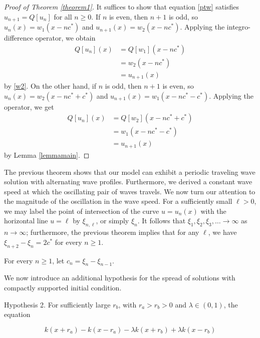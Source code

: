 \documentclass[11pt]{article}
\theoremstyle{definition}
\numberwithin{equation}{section}
\numberwithin{thm}{section}
\begin{document}
\begin{proof}[Proof of Theorem \ref{theorem1}]
It suffices to show that equation \eqref{ptw} satisfies $u_{n+1}=Q[u_n]$ for all $n \geq 0$. If $n$ is even, then $n+1$ is odd, so $u_n(x)=w_1(x-nc^*)$ and $u_{n+1}(x)=w_2(x-nc^*)$. Applying the integro-difference operator, we obtain
\begin{equation} \begin{aligned}
Q[u_n](x) &= Q[w_1](x-nc^*) \\
&= w_2(x-nc^*) \\
&= u_{n+1}(x)
\end{aligned} \end{equation}
by \eqref{w2}. On the other hand, if $n$ is odd, then $n+1$ is even, so $u_n(x)=w_2(x-nc^*+c^*)$ and $u_{n+1}(x)=w_1(x-nc^*-c^*)$. Applying the operator, we get
\begin{equation} \begin{aligned}
Q[u_n](x) &= Q[w_2](x-nc^*+c^*) \\
&= w_1(x-nc^*-c^*) \\
&= u_{n+1}(x)
\end{aligned} \end{equation}
by Lemma \ref{lemmamain}.
\end{proof}





The previous theorem shows that our model can exhibit a periodic traveling wave solution with alternating wave profiles. Furthermore, we derived a constant wave speed at which the oscillating pair of waves travels. We now turn our attention to the magnitude of the oscillation in the wave speed. For a sufficiently small $\ell > 0$, we may label the point of intersection of the curve $u=u_n(x)$ with the horizontal line $u=\ell$ by $\xi_{n,\ell}$, or simply $\xi_n$. It follows that $\xi_1,\xi_2,\xi_3,\dots\to\infty$ as $n\to\infty$; furthermore, the previous theorem implies that for any $\ell$, we have $\xi_{n+2}-\xi_n=2c^*$ for every $n\geq 1$.

For every $n\geq 1$, let $c_n = \xi_n - \xi_{n-1}$.

We now introduce an additional hypothesis for the spread of solutions with compactly supported initial condition.

Hypothesis 2. For sufficiently large $r_b$, with $r_a > r_b > 0$ and $\lambda \in (0,1)$, the equation

$$ k(x+r_a) - k(x-r_a) - \lambda k(x+r_b) + \lambda k(x-r_b) $$
\end{document}
